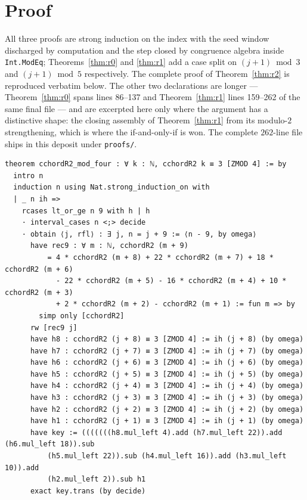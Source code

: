 \documentclass[11pt]{article}
\theoremstyle{definition}
\begin{document}
\section{Proof}\label{sec:proof}

All three proofs are strong induction on the index with the seed window
discharged by computation and the step closed by congruence algebra inside
\texttt{Int.ModEq}; Theorems~\ref{thm:r0} and \ref{thm:r1} add a case split on
$(j+1)\bmod 3$ and $(j+1)\bmod 5$ respectively. The complete proof of
Theorem~\ref{thm:r2} is reproduced verbatim below. The other two declarations
are longer --- Theorem~\ref{thm:r0} spans lines 86--137 and Theorem~\ref{thm:r1}
lines 159--262 of the same final file --- and are excerpted here only where the
argument has a distinctive shape: the closing assembly of Theorem~\ref{thm:r1}
from its modulo-$2$ strengthening, which is where the if-and-only-if is won. The
complete $262$-line file ships in this deposit under \texttt{proofs/}.

\begin{lstlisting}[caption={Complete proof of Theorem~\ref{thm:r2}, verbatim
lines 43--67 of \texttt{final/01-cchord-proved.lean} (sha256
\texttt{af39d35e}).},label={lst:p2}]
theorem cchordR2_mod_four : ∀ k : ℕ, cchordR2 k ≡ 3 [ZMOD 4] := by
  intro n
  induction n using Nat.strong_induction_on with
  | _ n ih =>
    rcases lt_or_ge n 9 with h | h
    · interval_cases n <;> decide
    · obtain ⟨j, rfl⟩ : ∃ j, n = j + 9 := ⟨n - 9, by omega⟩
      have rec9 : ∀ m : ℕ, cchordR2 (m + 9)
          = 4 * cchordR2 (m + 8) + 22 * cchordR2 (m + 7) + 18 * cchordR2 (m + 6)
            - 22 * cchordR2 (m + 5) - 16 * cchordR2 (m + 4) + 10 * cchordR2 (m + 3)
            + 2 * cchordR2 (m + 2) - cchordR2 (m + 1) := fun m => by
        simp only [cchordR2]
      rw [rec9 j]
      have h8 : cchordR2 (j + 8) ≡ 3 [ZMOD 4] := ih (j + 8) (by omega)
      have h7 : cchordR2 (j + 7) ≡ 3 [ZMOD 4] := ih (j + 7) (by omega)
      have h6 : cchordR2 (j + 6) ≡ 3 [ZMOD 4] := ih (j + 6) (by omega)
      have h5 : cchordR2 (j + 5) ≡ 3 [ZMOD 4] := ih (j + 5) (by omega)
      have h4 : cchordR2 (j + 4) ≡ 3 [ZMOD 4] := ih (j + 4) (by omega)
      have h3 : cchordR2 (j + 3) ≡ 3 [ZMOD 4] := ih (j + 3) (by omega)
      have h2 : cchordR2 (j + 2) ≡ 3 [ZMOD 4] := ih (j + 2) (by omega)
      have h1 : cchordR2 (j + 1) ≡ 3 [ZMOD 4] := ih (j + 1) (by omega)
      have key := (((((((h8.mul_left 4).add (h7.mul_left 22)).add (h6.mul_left 18)).sub
          (h5.mul_left 22)).sub (h4.mul_left 16)).add (h3.mul_left 10)).add
          (h2.mul_left 2)).sub h1
      exact key.trans (by decide)
\end{lstlisting}
\end{document}
